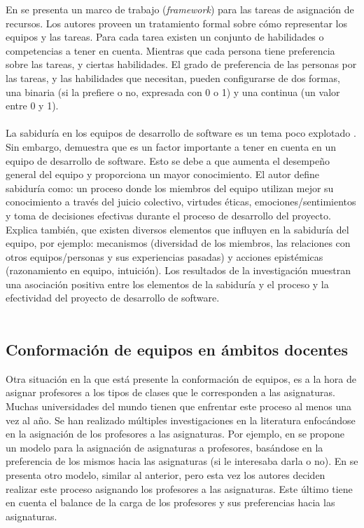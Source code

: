 En \cite{Anagnostopoulos2010} se presenta un marco de trabajo (\textit{framework}) para las tareas de asignación de recursos. Los autores proveen un tratamiento formal sobre cómo representar los equipos y las tareas. Para cada tarea existen un conjunto de habilidades o competencias a tener en cuenta. Mientras que cada persona tiene preferencia sobre las tareas, y ciertas habilidades. El grado de preferencia de las personas por las tareas, y las habilidades que necesitan, pueden configurarse de dos formas, una binaria (si la prefiere o no, expresada con 0 o 1) y una continua (un valor entre 0 y 1).\\\\


La sabiduría en los equipos de desarrollo de software es un tema poco explotado \cite{Akguen2020}. Sin embargo, \cite{Akguen2020} demuestra que es un factor importante a tener en cuenta en un equipo de desarrollo de software. Esto se debe a que aumenta el desempeño general del equipo y proporciona un mayor conocimiento. El autor define sabiduría como: un proceso donde los miembros del equipo utilizan mejor su conocimiento a través del juicio colectivo, virtudes éticas, emociones/sentimientos y toma de decisiones efectivas durante el proceso de desarrollo del proyecto. Explica también, que existen diversos elementos que influyen en la sabiduría del equipo, por ejemplo: mecanismos (diversidad de los miembros, las relaciones con otros equipos/personas y sus experiencias pasadas) y acciones epistémicas (razonamiento en equipo, intuición). Los resultados de la investigación muestran una asociación positiva entre los elementos de la sabiduría y el proceso y la efectividad del proyecto de desarrollo de software.\\\\



\subsection{Conformación de equipos en ámbitos docentes}

Otra situación en la que está presente la conformación de equipos, es a la hora de asignar profesores a los tipos de clases que le corresponden a las asignaturas. Muchas universidades del mundo tienen que enfrentar este proceso al menos una vez al año. Se han realizado múltiples investigaciones en la literatura enfocándose en la asignación de los profesores a las asignaturas. Por ejemplo, en \cite{Bosquez2020} se propone un modelo para la asignación de asignaturas a profesores, basándose en la preferencia de los mismos hacia las asignaturas (si le interesaba darla o no). En \cite{Domenech2014} se presenta otro modelo, similar al anterior, pero esta vez los autores deciden realizar este proceso asignando los profesores a las asignaturas. Este último tiene en cuenta el balance de la carga de los profesores y sus preferencias hacia las asignaturas. \\\\

